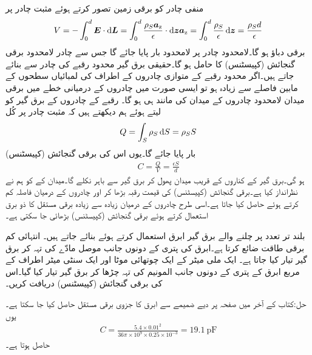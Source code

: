 منفی چادر کو برقی زمین تصور کرتے ہوئے مثبت چادر پر
\begin{align*}
V=-\int_0^d \kvec{E} \cdot \dif \kvec{L}=\int_0^d \frac{\rho_S \az}{\epsilon} \cdot \dif \kvec{z} \az=\int_0^d \frac{\rho_S }{\epsilon}  \dif \kvec{z}=\frac{\rho_S d}{\epsilon}
\end{align*}
برقی دباؤ ہو گا۔لامحدود چادر پر لامحدود بار پایا جائے گا جس سے چادر لامحدود برقی گنجائش (کپیسٹنس) کا حامل ہو گا۔حقیقی برق گیر محدود رقبے کی چادر سے بنائے جاتے ہیں۔اگر محدود رقبے کے متوازی چادروں کے اطراف کی لمبائیاں سطحوں کے مابین فاصلے سے زیادہ ہو تو ایسی صورت میں چادروں کے درمیانی خطے میں برقی میدان  لامحدود چادروں کے میدان کی مانند ہی ہو گا۔  رقبے کے چادروں کے برق گیر کو لیتے ہوئے ہم دیکھتے ہیں کہ مثبت چادر پر کُل
\begin{align*}
Q=\int_S \rho_S \dif S=\rho_S S
\end{align*}
بار پایا جائے  گا۔یوں اس کی برقی گنجائش (کپیسٹنس)
\begin{align}\label{مساوات_کپیسٹر_دو_چادر_کپیسٹر}
C=\frac{Q}{V}=\frac{\epsilon S}{d}
\end{align}
ہو گی۔برق گیر کے کناروں کے قریب میدان پھول کر برق گیر سے باہر نکلے گا۔میدان کے  کو ہم نے نظرانداز کیا ہے۔برقی گنجائش (کپیسٹنس) کی قیمت رقبہ بڑھا کر اور چادروں کے درمیان فاصلہ کم کرتے ہوئے حاصل کیا جاتا ہے۔اسی طرح چادروں کے درمیان زیادہ سے زیادہ برقی مستقل کا ذو برق استعمال کرتے ہوئے برقی گنجائش (کپیسٹنس) بڑھائی جا سکتی ہے۔

بلند تر تعدد پر چلنے والے برق گیر ابرق استعمال کرتے ہوئے بنائے جاتے ہیں۔ انتہائی کم برقی طاقت ضائع کرتا ہے۔ابرق کی پتری کے دونوں جانب موصل مادّے کی تہہ  کر برق گیر تیار کیا جاتا ہے۔
ایک ملی میٹر کے ایک چوتھائی موٹا اور ایک سنٹی میٹر اطراف کے مربع ابرق کے پتری کے دونوں جانب المونیم کی تہہ چڑھا کر برق گیر تیار کیا گیا۔اس کی برقی گنجائش (کپیسٹنس) دریافت کریں۔

حل:کتاب کے آخر میں صفحہ  پر دیے ضمیمے سے ابرق کا جزوی برقی مستقل  حاصل کیا جا سکتا ہے۔یوں
\begin{align*}
C=\frac{5.4 \times 0.01^2}{36 \pi \times 10^9 \times 0.25 \times 10^{-3}}=\SI{19.1}{\pico \farad}
\end{align*}
حاصل ہوتا ہے۔

